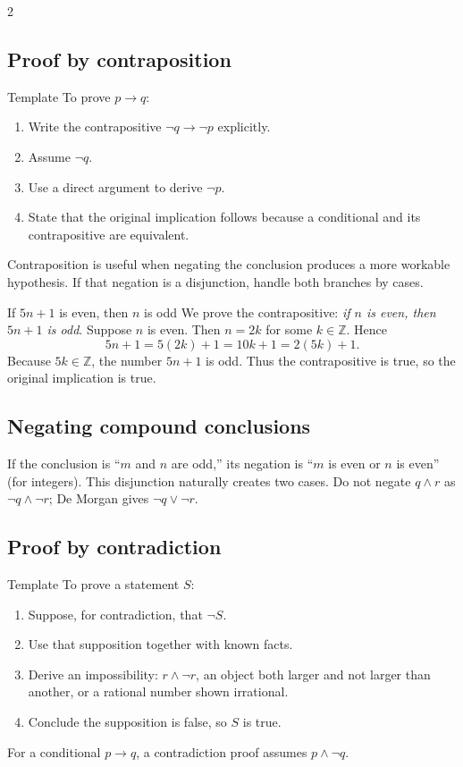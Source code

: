 \documentclass[10pt]{article}
\newcommand{\Z}{\mathbb Z}
\begin{document}
\begin{multicols}{2}
\raggedcolumns
\subsection*{Proof by contraposition}

\begin{methodbox}{Template}
To prove $p\to q$:
\begin{enumerate}
  \item Write the contrapositive $\neg q\to\neg p$ explicitly.
  \item Assume $\neg q$.
  \item Use a direct argument to derive $\neg p$.
  \item State that the original implication follows because a conditional and
        its contrapositive are equivalent.
\end{enumerate}
Contraposition is useful when negating the conclusion produces a more workable
hypothesis. If that negation is a disjunction, handle both branches by cases.
\end{methodbox}

\begin{workedbox}{If $5n+1$ is even, then $n$ is odd}
We prove the contrapositive: \emph{if $n$ is even, then $5n+1$ is odd}.
Suppose $n$ is even. Then $n=2k$ for some $k\in\Z$. Hence
\[
 5n+1=5(2k)+1=10k+1=2(5k)+1.
\]
Because $5k\in\Z$, the number $5n+1$ is odd. Thus the contrapositive is true,
so the original implication is true.
\end{workedbox}

\subsection*{Negating compound conclusions}
If the conclusion is ``$m$ and $n$ are odd,'' its negation is ``$m$ is even or
$n$ is even'' (for integers). This disjunction naturally creates two cases.
Do not negate $q\land r$ as $\neg q\land\neg r$; De Morgan gives
$\neg q\lor\neg r$.

\columnbreak
\subsection*{Proof by contradiction}

\begin{methodbox}{Template}
To prove a statement $S$:
\begin{enumerate}
  \item Suppose, for contradiction, that $\neg S$.
  \item Use that supposition together with known facts.
  \item Derive an impossibility: $r\land\neg r$, an object both larger and not
        larger than another, or a rational number shown irrational.
  \item Conclude the supposition is false, so $S$ is true.
\end{enumerate}
For a conditional $p\to q$, a contradiction proof assumes $p\land\neg q$.
\end{methodbox}


\end{multicols}
\end{document}
